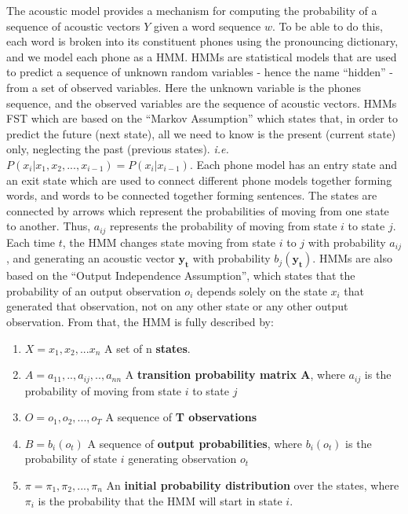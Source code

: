 The acoustic model provides a mechanism for computing the probability of a sequence of acoustic vectors $Y$ given a word sequence $w$. 
To be able to do this, each word is broken into its constituent phones using the pronouncing dictionary, and we model each phone as a \ac{HMM}. \ac{HMM}s are statistical models that are used to predict a sequence of unknown random variables - hence the name \enquote{hidden} -  from a set of observed variables. Here the unknown variable is the phones sequence, and the observed variables are the sequence of acoustic vectors. \ac{HMM}s \ac{FST} which are based on the \enquote{Markov Assumption} which states that, in order to predict the future (next state), all we need to know is the present  (current state) only, neglecting the past (previous states). \textit{i.e.} $ P(x_i|x_1,x_2,...,x_{i-1}) = P(x_i|x_{i-1}) $. Each phone model has an entry state and an exit state which are used to connect different phone models together forming words, and words to be connected together forming sentences. The states are connected by arrows which represent the probabilities of moving from one state to another. Thus, $a_{ij}$ represents the probability of moving from state $i$ to state $j$. Each time $t$, the \ac{HMM} changes state moving from state $i$ to $j$ with probability $a_{ij}$, and generating an acoustic vector $\mathbf{y_t}$ with probability $b_j(\mathbf{y_t})$. \ac{HMM}s are also based on the \enquote{Output Independence Assumption}, which states that the probability of an output observation $o_i$ depends solely on the state $x_i$ that generated that observation, not on any other state or any other output observation. From that, the \ac{HMM} is fully described by:
   \begin{enumerate}
   	\item $X=x_1,x_2,...x_n$ \quad \quad \quad \quad A set of n \textbf{states}.
   	\item $A=a_{11},..,a_{ij},..,a_{nn}$ \quad \quad A \textbf{transition probability matrix A}, where $a_{ij}$ is the probability of moving from state $i$ to state $j$
   	\item $O=o_1,o_2,...,o_T$ \quad \quad \quad \quad A sequence of \textbf{T observations}
   	\item $B=b_i(o_t)$ \quad \quad \quad \quad \quad \quad \quad A sequence of \textbf{output probabilities}, where $b_i(o_t)$ is the probability of state $i$ generating observation $o_t$
   	\item $\pi = \pi_1,\pi_2,...,\pi_n$ \quad \quad \quad \quad An \textbf{initial probability distribution} over the states, where $\pi_i$ is the probability that the \ac{HMM} will start in state $i$.
   	 \cite{keselj2009speech}
   	 
   \end{enumerate}

